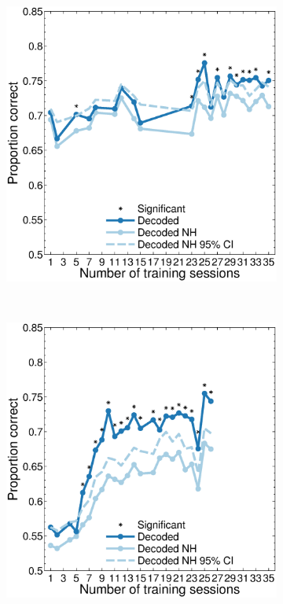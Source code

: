 \begin{figure}[htbp]
    \begin{subfigure}[b]{0.5\linewidth}
        \centering
        \caption{}
        \label{fig:decag_b4_allp}
	\includegraphics[width=\linewidth]{figs/decoding/agree_v4_blanco.eps}
    \end{subfigure}
    ~~
    \begin{subfigure}[b]{0.5\linewidth}
        \centering
        \caption{}
        \label{fig:decag_j4_allp}
	\includegraphics[width=\linewidth]{figs/decoding/agree_v4_jack.eps}

\end{subfigure}
\end{figure}
